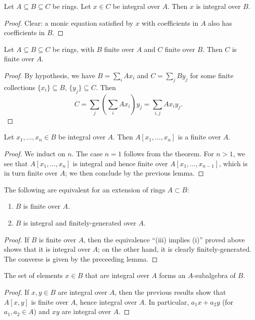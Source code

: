 \documentclass[10pt]{article}
\begin{document}
\begin{lemma}
  Let $A \subseteq B \subseteq C$ be rings.
  Let $x \in C$ be integral over $A$.
  Then $x$ is integral over $B$.
\end{lemma}
\begin{proof}
  Clear: a monic equation satisfied by $x$ with coefficients in $A$
  also has coefficients in $B$.
\end{proof}
\begin{lemma}
  Let $A \subseteq B \subseteq C$ be rings,
  with $B$ finite over $A$ and $C$ finite over $B$.
  Then $C$ is finite over $A$.
\end{lemma}
\begin{proof}
  By hypothesis,
  we have $B = \sum_i A x_i$ and $C = \sum_j B y_j$
  for some finite collections $\{x_i\} \subseteq B$,
  $\{y_j\} \subseteq C$.
  Then
  \[
  C = \sum_j (\sum_i A x_i) y_j
  = \sum_{i,j} A x_i y_j.
  \]
\end{proof}

\begin{lemma}
Let $x_1,\dotsc,x_n \in B$ be integral over $A$.
Then $A[x_1,\dotsc,x_n]$ is a finite over $A$.
\end{lemma}
\begin{proof}
  We induct on $n$.
  The case $n = 1$ follows from the theorem.
  For $n > 1$,
  we see that $A[x_1,\dotsc,x_n]$ is integral and hence finite
  over $A[x_1,\dotsc,x_{n-1}]$, which is in turn finite over
  $A$; we then conclude by the previous lemma.  
\end{proof}

\begin{corollary}
  The following are equivalent
  for an extension of rings $A \subset B$:
  \begin{enumerate}
  \item $B$ is finite over $A$.
  \item $B$ is integral and finitely-generated over $A$.
  \end{enumerate}
\end{corollary}
\begin{proof}
  If $B$ is finite over $A$,
  then the equivalence ``(iii) implies (i)''
  proved above
  shows that it is integral over $A$;
  on the other hand, it is clearly finitely-generated.
  The converse is given by the preceeding lemma.
\end{proof}

\begin{corollary}
  The set of elements $x \in B$ that are integral over $A$ forms
  an $A$-subalgebra of $B$.
\end{corollary}
\begin{proof}
  If $x,y \in B$ are integral over $A$,
  then the previous results show that $A[x,y]$
  is finite over $A$,
  hence integral over $A$.
  In particular, $a_1 x + a_2 y$ (for $a_1,a_2 \in A$)
  and $x y$ are integral over $A$.
\end{proof}
\end{document}
